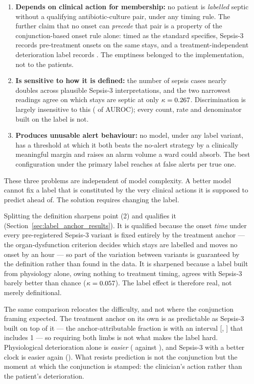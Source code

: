 \begin{enumerate}
    \item \textbf{Depends on clinical action for membership:} no patient is
    \emph{labelled} septic without a qualifying antibiotic-culture pair, under
    any timing rule. The further claim that no onset can \emph{precede} that
    pair is a property of the conjunction-based onset rule alone: timed as the
    standard specifies, Sepsis-3 records \pcPreTreatOnsetsVarF{} pre-treatment
    onsets on the same stays, and a treatment-independent deterioration label
    records \pcPreTreatOnsetsVarD{}. The emptiness belonged to the
    implementation, not to the patients.
    \item \textbf{Is sensitive to how it is defined:} the number of sepsis
    cases nearly doubles across plausible Sepsis-3 interpretations, and the two
    narrowest readings agree on which stays are septic at only
    $\kappa = 0.267$. Discrimination is largely insensitive to this
    (\pcSpreadLabel{} of AUROC); every count, rate and denominator built on the
    label is not.
    \item \textbf{Produces unusable alert behaviour:} no model, under any label
    variant, has a threshold at which it both beats the no-alert strategy by a
    clinically meaningful margin and raises an alarm volume a ward could
    absorb. The best configuration under the primary label reaches
    \pcUtilityMaxGbtB{} at \pcUtilityOptBurdenGbtB{} false alerts per true one.
\end{enumerate}

These three problems are independent of model complexity. A better model
cannot fix a label that is constituted by the very clinical actions it is
supposed to predict ahead of. The solution requires changing the label.

Splitting the definition sharpens point (2) and qualifies it
(Section~\ref{sec:label_anchor_results}). It is qualified because the onset
\emph{time} under every pre-registered Sepsis-3 variant is fixed entirely by the
treatment anchor --- the organ-dysfunction criterion decides which stays are
labelled and moves no onset by an hour --- so part of the variation between
variants is guaranteed by the definition rather than found in the data. It is
sharpened because a label built from physiology alone, owing nothing to
treatment timing, agrees with Sepsis-3 barely better than chance
($\kappa = 0.057$). The label effect is therefore real, not merely
definitional.

The same comparison relocates the difficulty, and not where the conjunction
framing expected. The treatment anchor on its own is as predictable as Sepsis-3
built on top of it --- the anchor-attributable fraction is
\pcPhiAnchorPrimary{} with an interval
[\pcPhiAnchorCiLoPrimary, \pcPhiAnchorCiHiPrimary] that includes 1 --- so
requiring both limbs is not what makes the label hard. Physiological
deterioration alone is \emph{easier} (\pcAltAurocFullPrimaryD{} against
\pcAurocPrimaryB), and Sepsis-3 with a better clock is easier again
(\pcAltAurocFullPrimaryF). What resists prediction is not the conjunction but
the moment at which the conjunction is stamped: the clinician's action rather
than the patient's deterioration.


